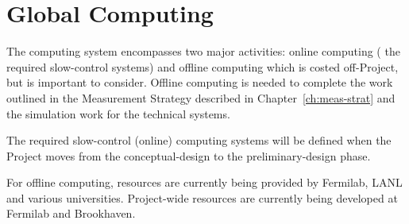 \section{Global Computing}
\label{sec:nd-gdaq-global-computing}

The computing system encompasses two major activities: %
online computing (%
the required slow-control systems) and %
offline 
computing which is costed off-Project, but is important to consider.
Offline computing is needed to complete 
the work outlined in the Measurement Strategy described in Chapter~\ref{ch:meas-strat} and the simulation work %
for the technical systems.

The required slow-control (online) computing systems will be defined when the Project moves 
from the conceptual-design to the preliminary-design phase.

For offline computing, resources are currently being provided by Fermilab, 
LANL and various universities.  Project-wide resources are currently 
being developed at Fermilab and Brookhaven.
